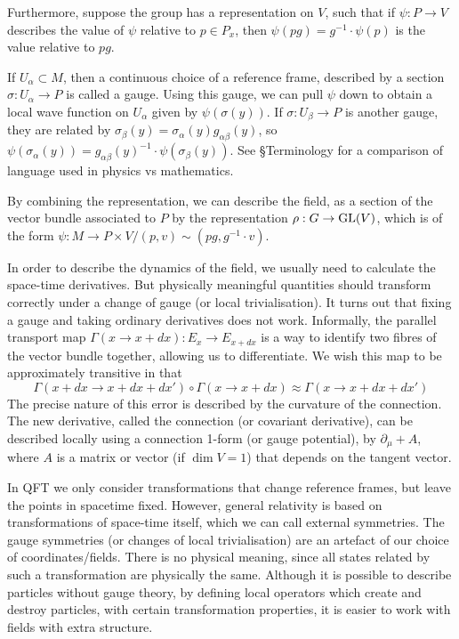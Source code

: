Furthermore, suppose the group has a representation
on $V$, such that if  $\psi:P\to V$ describes the value of  $\psi$ relative to
$p\in P_x$, then $\psi(pg)=g^{-1}\cdot\psi(p)$ is the value relative to $pg$. 

If  $U_{\alpha}\subset M$, then a continuous choice of a reference frame, described by a
section $\sigma:U_{\alpha}\to P$ is called a gauge. Using this gauge, we can pull $\psi$
down to obtain a local wave function on $U_{\alpha}$ given by
$\psi(\sigma(y))$. If $\sigma:U_{\beta}\to P$ is another gauge, they are related
by $\sigma_\beta(y) = \sigma_\alpha(y)g_{\alpha\beta}(y)$, so
$\psi(\sigma_\alpha(y))=g_{\alpha\beta}(y)^{-1}\cdot\psi(\sigma_\beta(y))$.
See \S Terminology for a comparison of language used in physics vs mathematics. 

By combining the representation, we can describe the field, as a section of
the vector bundle associated to $P$ by the representation  $\rho:G\to \operatorname{GL}(V)$,
which is of the form $\psi:M\to P\times V / (p,v) \sim (pg, g^{-1}\cdot v)$. 

In order to describe the dynamics of the field, we usually need to calculate the
space-time derivatives. But physically meaningful quantities should transform
correctly under a change of gauge (or local trivialisation). It turns out that 
fixing a gauge and taking ordinary derivatives does not work. Informally, the parallel
transport map $\Gamma(x\to x+dx) : E_x \to E_{x+dx}$ is a way to identify two
fibres of the vector bundle together, allowing us to differentiate. 
We wish this map to be approximately transitive in that 
\[
\Gamma(x+dx \to x+dx+dx') \circ \Gamma(x\to x+dx) \approx \Gamma(x\to x+dx+dx')
\] 
The precise nature of this error is described by the curvature of the
connection. The new derivative, called the connection (or covariant derivative), can be 
described locally using a connection 1-form (or gauge potential),
by $\partial_\mu+A$, where
$A$ is a matrix or vector (if $\dim V=1$) that depends on the tangent vector.

In QFT we only consider transformations that change reference frames, but leave
the points in spacetime fixed. However, general relativity is based on
transformations of space-time itself, which we can call external symmetries. 
The gauge symmetries (or changes of local trivialisation) are an artefact of our 
choice of coordinates/fields. There is no
physical meaning, since all states related by such a transformation are
physically the same. 
Although it is possible to describe particles without gauge theory, by defining
local operators which create and destroy particles, with certain transformation
properties, it is easier to work with fields with extra structure.

